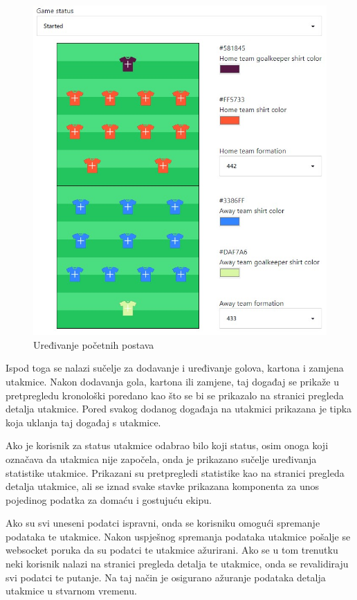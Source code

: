 \documentclass[times, utf8, zavrsni]{fer}
\begin{document}
\begin{figure}[htb]
\centering
\includegraphics[width=12cm]{images/edit-game.jpg}
\caption{Uređivanje početnih postava}
\label{fig:formation}
\end{figure}

Ispod toga se nalazi sučelje za dodavanje i uređivanje golova, kartona i zamjena utakmice.
Nakon dodavanja gola, kartona ili zamjene, taj događaj se prikaže u pretpregledu kronološki poredano kao što se bi se prikazalo na stranici pregleda detalja utakmice.
Pored svakog dodanog događaja na utakmici prikazana je tipka koja uklanja taj događaj s utakmice.

Ako je korisnik za status utakmice odabrao bilo koji status, osim onoga koji označava da utakmica nije započela, onda je prikazano sučelje uređivanja statistike utakmice.
Prikazani su pretpregledi statistike kao na stranici pregleda detalja utakmice, ali se iznad svake stavke prikazana komponenta za unos pojedinog podatka za domaću i gostujuću ekipu.

Ako su svi uneseni podatci ispravni, onda se korisniku omogući spremanje podataka te utakmice. Nakon uspješnog spremanja podataka utakmice pošalje se websocket poruka da su podatci te utakmice ažurirani.
Ako se u tom trenutku neki korisnik nalazi na stranici pregleda detalja te utakmice, onda se revalidiraju svi podatci te putanje. Na taj način je osigurano ažuranje podataka detalja utakmice u stvarnom vremenu.
\end{document}
